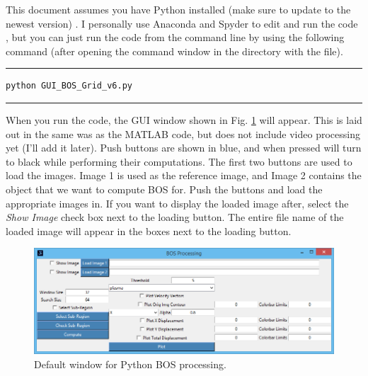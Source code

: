 \documentclass[letterpaper,12pt]{article}
\begin{document}
This document assumes you have Python installed (make sure to update to the newest version) \cite{Python}.  I personally use Anaconda and Spyder to edit and run the code \cite{Anaconda}, but you can just run the code from the command line by using the following command (after opening the command window in the directory with the file).

\par\noindent\rule{\textwidth}{0.4pt}

\vspace{1em}
\lstset{basicstyle=\large}
\begin{lstlisting}[style=CMD]
python GUI_BOS_Grid_v6.py
\end{lstlisting}

\par\noindent\rule{\textwidth}{0.4pt}

When you run the code, the GUI window shown in Fig. \ref{fig:Python_GUI_BOS} will appear.  This is laid out in the same was as the MATLAB code, but does not include video processing yet (I'll add it later).  Push buttons are shown in blue, and when pressed will turn to black while performing their computations.  The first two buttons are used to load the images.  Image 1 is used as the reference image, and Image 2 contains the object that we want to compute BOS for.  Push the buttons and load the appropriate images in.  If you want to display the loaded image after, select the \textcolor{myBlue}{\textit{Show Image}} check box next to the loading button.  The entire file name of the loaded image will appear in the boxes next to the loading button.

\begin{figure}[h]
    \centering
    \includegraphics[width=0.8\linewidth]{Python_GUI_BOS.PNG}
    \caption{Default window for Python BOS processing.}
    \label{fig:Python_GUI_BOS}
\end{figure}
\end{document}
